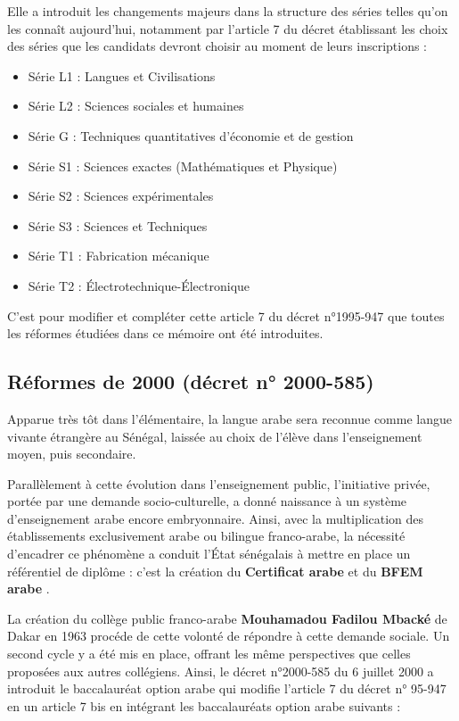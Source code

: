 Elle a introduit les changements majeurs dans la structure des séries telles qu'on les connaît aujourd'hui, 
notamment par l'article 7 du décret établissant les choix des séries que les candidats devront choisir au moment de leurs inscriptions :

\begin{itemize}
    \item Série L1 : Langues et Civilisations
    \item Série L2 : Sciences sociales et humaines
    \item Série G : Techniques quantitatives d'économie et de gestion
    \item Série S1 : Sciences exactes (Mathématiques et Physique)
    \item Série S2 : Sciences expérimentales
    \item Série S3 : Sciences et Techniques
    \item Série T1 : Fabrication mécanique
    \item Série T2 : Électrotechnique-Électronique
\end{itemize}

C'est pour modifier et compléter cette article 7 du décret n°1995-947 que toutes les réformes étudiées dans ce mémoire ont été introduites.

\subsection{Réformes de 2000 (décret n° 2000-585)}

Apparue très tôt dans l'élémentaire, la langue arabe sera reconnue comme langue vivante étrangère au Sénégal, laissée au choix de l'élève dans l'enseignement moyen, puis secondaire.

Parallèlement à cette évolution dans l'enseignement public, l'initiative privée, portée par une demande socio-culturelle, a donné naissance à un système d'enseignement arabe encore embryonnaire.
Ainsi, avec la multiplication des établissements exclusivement arabe ou bilingue franco-arabe, la nécessité d'encadrer ce phénomène a conduit l'État sénégalais à mettre en place un référentiel de diplôme : 
c'est la création du \textbf{Certificat arabe} et du \textbf{BFEM arabe} \cite{decret2000}.

La création du collège public franco-arabe \textbf{Mouhamadou Fadilou Mbacké} de Dakar en 1963 procéde de cette volonté de répondre à cette demande sociale. Un second cycle y a été mis en place, offrant les même perspectives que celles proposées aux autres collégiens.
Ainsi, le décret n°2000-585 du 6 juillet 2000 a introduit le baccalauréat option arabe qui modifie l'article 7 du décret n° 95-947 en un article 7 bis en intégrant les baccalauréats option arabe suivants : 

